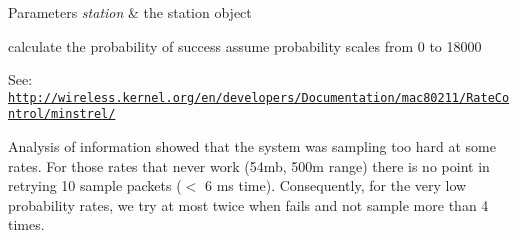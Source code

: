 \begin{DoxyParams}{Parameters}
{\em station} & the station object \\
\hline
\end{DoxyParams}
calculate the probability of success assume probability scales from 0 to 18000

See\+: \href{http://wireless.kernel.org/en/developers/Documentation/mac80211/RateControl/minstrel/}{\tt http\+://wireless.\+kernel.\+org/en/developers/\+Documentation/mac80211/\+Rate\+Control/minstrel/}

Analysis of information showed that the system was sampling too hard at some rates. For those rates that never work (54mb, 500m range) there is no point in retrying 10 sample packets ($<$ 6 ms time). Consequently, for the very low probability rates, we try at most twice when fails and not sample more than 4 times.
